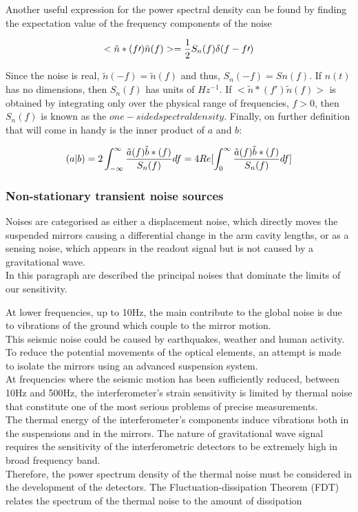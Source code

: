\documentclass[binding=0.6cm, LaM]{sapthesis}
\begin{document}
	Another useful expression for the power spectral density can be found by finding 
	the expectation value of the frequency components of the noise

		\begin{equation}
		<\tilde{n}\ast(f\prime)\tilde{n}(f)>  = {1 \over 2} S_n(f) \delta (f-f\prime)
		\end{equation}

	Since the noise is real, $\tilde{n}(-f) = \tilde{n}(f)$ and thus, $S_n(−f) = Sn(f)$. 
	If $n(t)$ has no dimensions, then $S_n(f)$ has units of $Hz^{-1}$.
 	If $<\tilde{n}\ast(f\prime)\tilde{n}(f)> $ is obtained by integrating only over the physical
	range of frequencies, $f > 0$, then $S_n(f)$ is known as the $one-sided spectral density$.
	Finally, on further definition that will come in handy is the inner product of $a$ and $b$:


		\begin{equation}
		(a|b) = 2 \int^{\infty}_{-\infty} {{\tilde{a}(f)\tilde{b}\ast(f)} \over {S_n(f)}}df = 4 Re [\int^{\infty}_{0}{{\tilde{a}(f)\tilde{b}\ast(f)} \over {S_n(f)}} df]
		\end{equation}


\subsubsection{Non-stationary transient noise sources}

	Noises are categorised as either a displacement noise, which directly moves the suspended mirrors 
	causing a differential change in the arm cavity lengths, or as a sensing noise, 
	which appears in the readout signal but is not caused by a gravitational wave. \\ 
	In this paragraph are described the principal noises that dominate the limits of our sensitivity. 

	At lower frequencies, up to 10Hz, the main contribute to the global noise 
	is due to vibrations of the ground which couple to the mirror motion. \\
	This seismic noise could be caused by earthquakes, weather and human activity. 
	To reduce the potential movements of the optical elements, an attempt is made to 
	isolate the mirrors using an advanced suspension system. \\
	At frequencies where the seismic motion has been sufficiently reduced, 
	between 10Hz and 500Hz, the interferometer’s strain sensitivity is limited by thermal noise 
	that constitute one of the most serious problems of precise measurements. \\
	The thermal energy of the interferometer’s components induce vibrations both in the suspensions and in the mirrors. 
	The nature of gravitational wave signal requires the sensitivity of the interferometric detectors 
	to be extremely high in broad frequency band. \\
	Therefore, the power spectrum density of the thermal noise must be considered in the development of the detectors. 
	The Fluctuation-dissipation Theorem (FDT) relates the spectrum of the thermal noise to the amount of dissipation 
\end{document}
